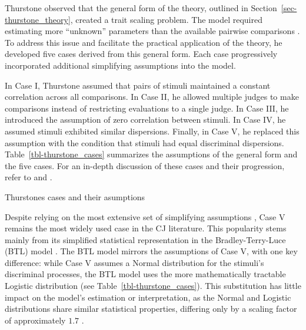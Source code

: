 \documentclass[
  authoryear,
  preprint,
  1p]{elsarticle}
\begin{document}
Thurstone observed that the general form of the theory, outlined in
Section~\ref{sec-thurstone_theory}, created a trait scaling problem. The
model required estimating more ``unknown'' parameters than the available
pairwise comparisons \citep[pp.~267]{Thurstone_1927b}. To address this
issue and facilitate the practical application of the theory, he
developed five cases derived from this general form. Each case
progressively incorporated additional simplifying assumptions into the
model.

In Case I, Thurstone assumed that pairs of stimuli maintained a constant
correlation across all comparisons. In Case II, he allowed multiple
judges to make comparisons instead of restricting evaluations to a
single judge. In Case III, he introduced the assumption of zero
correlation between stimuli. In Case IV, he assumed stimuli exhibited
similar dispersions. Finally, in Case V, he replaced this assumption
with the condition that stimuli had equal discriminal dispersions.
Table~\ref{tbl-thurstone_cases} summarizes the assumptions of the
general form and the five cases. For an in-depth discussion of these
cases and their progression, refer to \citet{Thurstone_1927b} and
\citet[pp.~248--253]{Bramley_2008}.

\begin{table}

\caption{\label{tbl-thurstone_cases}Thurstones cases and their
asumptions}


\end{table}%

Despite relying on the most extensive set of simplifying assumptions
\citetext{\citealp[pp.~253]{Bramley_2008}; \citealp[pp.~677]{Kelly_et_al_2022}},
Case V remains the most widely used case in the CJ literature. This
popularity stems mainly from its simplified statistical representation
in the Bradley-Terry-Luce (BTL) model
\citep{Bradley_et_al_1952, Luce_1959}. The BTL model mirrors the
assumptions of Case V, with one key difference: while Case V assumes a
Normal distribution for the stimuli's discriminal processes, the BTL
model uses the more mathematically tractable Logistic distribution
\citep[pp.~254]{Andrich_1978, Bramley_2008} (see
Table~\ref{tbl-thurstone_cases}). This substitution has little impact on
the model's estimation or interpretation, as the Normal and Logistic
distributions share similar statistical properties, differing only by a
scaling factor of approximately \(1.7\)
\citep[pp.~16]{vanderLinden_et_al_2017_I}.
\end{document}

